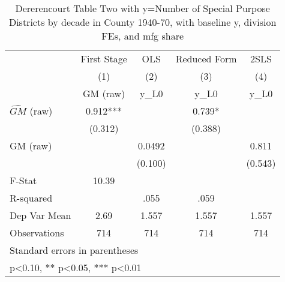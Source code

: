 \begin{table}[htbp]\centering
\def\sym#1{\ifmmode^{#1}\else\(^{#1}\)\fi}
\caption{Dererencourt Table Two with y=Number of Special Purpose Districts by decade in County 1940-70, with baseline y, division FEs, and mfg share}
\begin{tabular}{l*{4}{c}}
\toprule
                    & First Stage   &         OLS   &Reduced Form   &        2SLS   \\
                    &\multicolumn{1}{c}{(1)}&\multicolumn{1}{c}{(2)}&\multicolumn{1}{c}{(3)}&\multicolumn{1}{c}{(4)}\\
                    &\multicolumn{1}{c}{GM  (raw)}&\multicolumn{1}{c}{y\_L0}&\multicolumn{1}{c}{y\_L0}&\multicolumn{1}{c}{y\_L0}\\
\midrule
$\hat{GM}$ (raw)    &       0.912***&               &       0.739*  &               \\
                    &     (0.312)   &               &     (0.388)   &               \\
\addlinespace
GM  (raw)           &               &      0.0492   &               &       0.811   \\
                    &               &     (0.100)   &               &     (0.543)   \\
\midrule
F-Stat              &       10.39   &               &               &               \\
R-squared           &               &        .055   &        .059   &               \\
Dep Var Mean        &        2.69   &       1.557   &       1.557   &       1.557   \\
Observations        &         714   &         714   &         714   &         714   \\
\bottomrule
\multicolumn{5}{l}{\footnotesize Standard errors in parentheses}\\
\multicolumn{5}{l}{\footnotesize * p<0.10, ** p<0.05, *** p<0.01}\\
\end{tabular}
\end{table}
